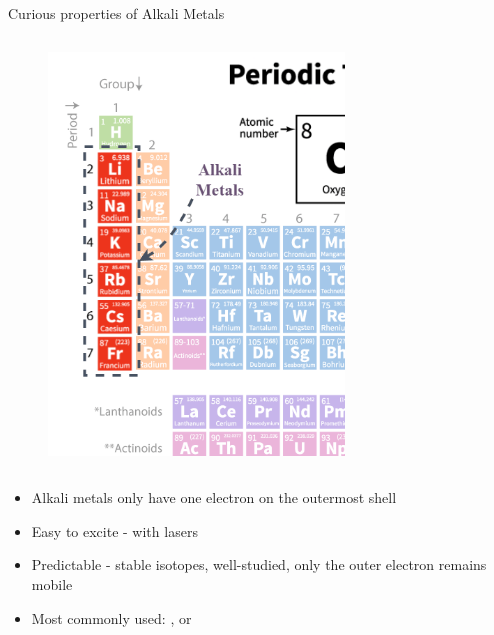 \begin{columnframe}{Curious properties of Alkali Metals}
    \begin{column}{0.5\textwidth}
        \begin{figure}
            \centering
            \includegraphics[width=0.7\textwidth]{images/alkali_metals_tb_of_elements.png}
        \end{figure}
    \end{column}
    \begin{column}{0.5\textwidth}
        \begin{itemize}
            \item Alkali metals only have one electron on the outermost shell
            \item Easy to excite - with lasers
            \item Predictable - stable isotopes, well-studied, only the outer electron remains mobile
            \item Most commonly used: , or 
        \end{itemize}
    \end{column}
\end{columnframe}

